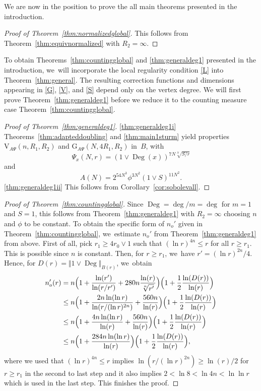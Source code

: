 \documentclass[10pt]{amsart}
\newcommand{\rG}{\mathrm{G}}
\newcommand{\rV}{\mathrm{V}}
\theoremstyle{plain}
\theoremstyle{definition}
\DeclareMathOperator{\Deg}{Deg}
\begin{document}
We are now in the position to prove the all main theorems presented in the introduction.
\begin{proof}[Proof of Theorem~\ref{thm:normalizedglobal}]
This follows from Theorem~\ref{thm:equivnormalized} with $R_2=\infty$.
\end{proof}

To obtain Theorems~\ref{thm:countingglobal} and \ref{thm:generaldeg1} presented in the introduction, we~will incorporate the local regularity condition \eqref{L} into Theorem~\ref{thm:general}. The resulting correction functions and dimensions appearing in \eqref{G}, \eqref{V}, and \eqref{S} depend only on the vertex degree.
We will first prove Theorem~\ref{thm:generaldeg1} before we reduce it to the counting measure case Theorem~\ref{thm:countingglobal}.

\skpt
\begin{proof}[Proof of Theorem~\ref{thm:generaldeg1}]
\par
\eqref{thm:generaldeg1i}
Theorems~\ref{thm:adapteddoubling} and \ref{thm:main1sturm} yield properties $\rV_{\!A\Psi}(n,R_1,R_2)$ and $\rG_{A \Psi}(N,4R_1,R_2)$ in~$B$, with
\[
\Psi_x(N,r)
=\left(1\vee\Deg(x)\right)^{7N\sqrt[N]{S/r}}
\]
and
\[
A(N)
=2^{54N^3}\phi^{3N^2}(1\vee S)^{11N^2}.
\]
\eqref{thm:generaldeg1ii}
This follows from Corollary~\ref{cor:sobolevall}.
\end{proof}

\begin{proof}[Proof of Theorem~\ref{thm:countingglobal}] Since $ \Deg=\deg/m =\deg$ for $ m=1 $ and $S=1$, this follows from {Theorem~\ref{thm:generaldeg1} with $R_2=\infty$ choosing $ n $ and $ \phi $ to be constant}. To obtain the specific form of $ n_o' $ given in Theorem~\ref{thm:countingglobal}, we~estimate $ n_o' $ from Theorem~\ref{thm:generaldeg1} from above. First of all, pick
$r_1\ge 4r_0 \vee 1$ such that $(\ln r)^{4n} \le r$ for all $r\ge r_1$. This is possible since $n$ is constant. Then, for $r\ge r_1$, we~have $r'= (\ln r)^{2n}/4$. Hence, for $D(r)=\Vert 1\vee \Deg\Vert_{B(r)}$, we~obtain
\begin{align*}
n_o'(r)&=
n \Bigl(1+\frac{\ln(r')}{\ln(r/r')} +{280 n{\frac{\ln (r)}{\sqrt[ n]{r'}}}}\Bigr)\Bigl(1+ \frac{1}{2}\frac{\ln (D(r))} {\ln (r)}\Bigr)\\
&\le n \Bigl(1+\frac{2n \ln(\ln r) }{\ln(r / (\ln r)^{2n}) } +\frac{560 n}{\ln (r)}\Bigr)\Bigl(1+ \frac{1}{2}\frac{\ln (D(r))} {\ln (r)}\Bigr)\\
&\le n \Bigl(1+\frac{4n \ln(\ln r) }{\ln(r) } +\frac{560 n}{\ln (r)}\Bigr)\Bigl(1+ \frac{1}{2}\frac{\ln (D(r))} {\ln (r)}\Bigr)\\
&\le n \Bigl(1+\frac{284n \ln(\ln r) }{\ln(r) } \Bigr)\Bigl(1+ \frac{1}{2}\frac{\ln (D(r))} {\ln (r)}\Bigr),
\end{align*}
where we used that $(\ln r)^{4n} \le r$ implies $\ln(r/( \ln r)^{2n})\ge \ln(r)/2$ for $r\ge r_1$ in the second to last step and it also implies $2<\ln 8< \ln 4n <\ln \ln r$ which is used in the last step. This finishes the proof.
\end{proof}
\end{document}
